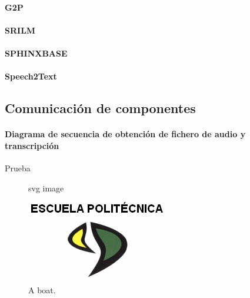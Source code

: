 \documentclass[../main.tex]{subfiles}
\begin{document}
\paragraph{G2P}
\paragraph{SRILM}
\paragraph{SPHINXBASE}
\paragraph{Speech2Text}

\subsection{Comunicación de componentes}\label{subsec:comunicacion_componentes}

\paragraph{Diagrama de secuencia de obtención de fichero de audio y transcripción}
Prueba
\begin{figure}[htbp]
  \centering
  
  \caption{svg image}
\end{figure}
\begin{figure}[H]
  \includegraphics[width=\linewidth]{pictures/logo_epcc.png} %
  \caption{A boat.} %
  \label{fig:boat1} %
\end{figure}
\end{document}

